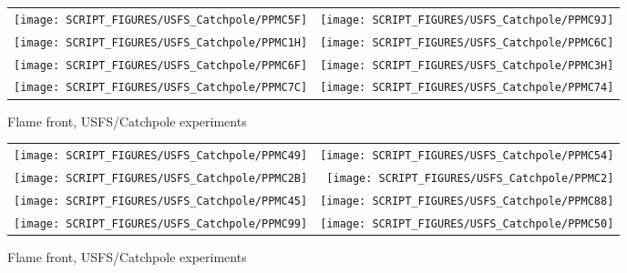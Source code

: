 \begin{figure}[p]
\begin{tabular*}{\textwidth}{l@{\extracolsep{\fill}}r}
\texttt{[image: SCRIPT\_FIGURES/USFS\_Catchpole/PPMC5F]} &
\texttt{[image: SCRIPT\_FIGURES/USFS\_Catchpole/PPMC9J]} \\
\texttt{[image: SCRIPT\_FIGURES/USFS\_Catchpole/PPMC1H]} &
\texttt{[image: SCRIPT\_FIGURES/USFS\_Catchpole/PPMC6C]} \\
\texttt{[image: SCRIPT\_FIGURES/USFS\_Catchpole/PPMC6F]} &
\texttt{[image: SCRIPT\_FIGURES/USFS\_Catchpole/PPMC3H]} \\
\texttt{[image: SCRIPT\_FIGURES/USFS\_Catchpole/PPMC7C]} &
\texttt{[image: SCRIPT\_FIGURES/USFS\_Catchpole/PPMC74]} \\
\end{tabular*}
\caption[Flame front, USFS/Catchpole experiments]{Flame front, USFS/Catchpole experiments}
\label{USFS_Catchpole_184}
\end{figure}

\begin{figure}[p]
\begin{tabular*}{\textwidth}{l@{\extracolsep{\fill}}r}
\texttt{[image: SCRIPT\_FIGURES/USFS\_Catchpole/PPMC49]} &
\texttt{[image: SCRIPT\_FIGURES/USFS\_Catchpole/PPMC54]} \\
\texttt{[image: SCRIPT\_FIGURES/USFS\_Catchpole/PPMC2B]} &
\texttt{[image: SCRIPT\_FIGURES/USFS\_Catchpole/PPMC2]} \\
\texttt{[image: SCRIPT\_FIGURES/USFS\_Catchpole/PPMC45]} &
\texttt{[image: SCRIPT\_FIGURES/USFS\_Catchpole/PPMC88]} \\
\texttt{[image: SCRIPT\_FIGURES/USFS\_Catchpole/PPMC99]} &
\texttt{[image: SCRIPT\_FIGURES/USFS\_Catchpole/PPMC50]} \\
\end{tabular*}
\caption[Flame front, USFS/Catchpole experiments]{Flame front, USFS/Catchpole experiments}
\label{USFS_Catchpole_192}
\end{figure}

